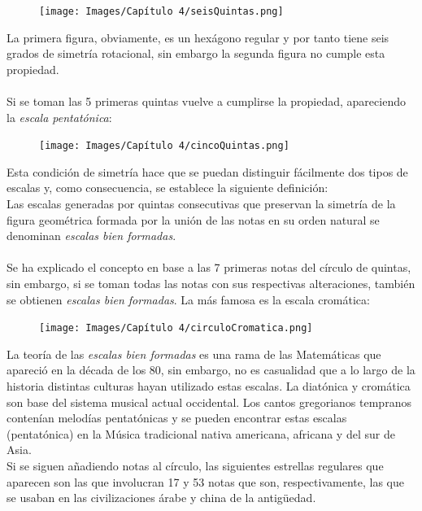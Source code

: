 \documentclass[a4paper, openright, 11pt, titlepage]{report}
\theoremstyle{definition}\newtheorem{defin}[propo]{Definition}
\theoremstyle{definition}\newtheorem{obser}[propo]{Remark}
\theoremstyle{definition}\newtheorem{ejem}[propo]{Ejemplo}
\theoremstyle{definition}\newtheorem{algoritmo}[propo]{Algoritmo}
\begin{document}
\begin{figure}[H]
    \centering
    \texttt{[image: Images/Capítulo 4/seisQuintas.png]}
\end{figure}
La primera figura, obviamente, es un hexágono regular y por tanto tiene seis grados de simetría rotacional, sin embargo la segunda figura no cumple esta propiedad.\\\\
Si se toman las 5 primeras quintas vuelve a cumplirse la propiedad, apareciendo la \textit{escala pentatónica}:
\begin{figure}[H]
    \centering
    \texttt{[image: Images/Capítulo 4/cincoQuintas.png]}
\end{figure}
Esta condición de simetría hace que se puedan distinguir fácilmente dos tipos de escalas y, como consecuencia, se establece la siguiente definición:\\
Las escalas generadas por quintas consecutivas que preservan la simetría de la figura geométrica formada por la unión de las notas en su orden natural se denominan \textit{escalas bien formadas}.\\\\
Se ha explicado el concepto en base a las 7 primeras notas del círculo de quintas, sin embargo, si se toman todas las notas con sus respectivas alteraciones, también se obtienen \textit{escalas bien formadas}. La más famosa es la escala cromática: 
\begin{figure}[H]
    \centering
    \texttt{[image: Images/Capítulo 4/circuloCromatica.png]}
\end{figure}
La teoría de las \textit{escalas bien formadas} es una rama de las Matemáticas que apareció en la década de los 80, sin embargo, no es casualidad que a lo largo de la historia distintas culturas hayan utilizado estas escalas. La diatónica y cromática son base del sistema musical actual occidental. Los cantos gregorianos tempranos contenían melodías pentatónicas y se pueden encontrar estas escalas (pentatónica) en la Música tradicional nativa americana, africana y del sur de Asia.\\
Si se siguen añadiendo notas al círculo, las siguientes estrellas regulares que aparecen son las que involucran 17 y 53 notas que son, respectivamente, las que se usaban en las civilizaciones árabe y china de la antigüedad.
\end{document}
